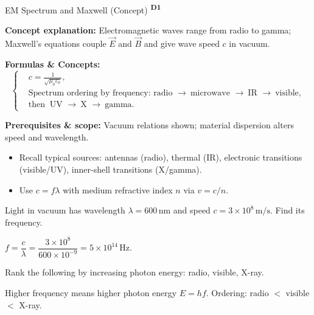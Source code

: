 ﻿\documentclass[12pt,a4paper]{article}
\providecommand{\KPFormulas}{}
\providecommand{\KPHeuristics}{}
\providecommand{\KPProblems}{}
\newcommand{\DOne}{\texorpdfstring{\textsuperscript{\textbf{D1}}}{ D1}}
\begin{document}
\begin{KnowledgePoint}{EM Spectrum and Maxwell (Concept) \DOne}
  \KPFormulas
  \begin{formulabox}
  \textbf{Concept explanation:} Electromagnetic waves range from radio to gamma; Maxwell's equations couple $\vec E$ and $\vec B$ and give wave speed $c$ in vacuum.

  \textbf{Formulas \& Concepts:}
  \[
  \left\{\begin{aligned}
    &c=\frac{1}{\sqrt{\mu_0\varepsilon_0}},\\
      &\text{Spectrum ordering by frequency: radio }\to\ \text{microwave }\to\ \text{IR }\to\ \text{visible},\\
      &\text{then }\ \text{UV }\to\ \text{X }\to\ \text{gamma}.
  \end{aligned}\right.
  \]

  \textbf{Prerequisites \& scope:} Vacuum relations shown; material dispersion alters speed and wavelength.
  \end{formulabox}

  \KPHeuristics
  \begin{heuristicsbox}
  \begin{itemize}[leftmargin=*]
    \item   Recall typical sources: antennas (radio), thermal (IR), electronic transitions (visible/UV), inner-shell transitions (X/gamma).
    \item Use $c=f\lambda$ with medium refractive index $n$ via $v=c/n$.
  \end{itemize}
  \end{heuristicsbox}

  \KPProblems
\begin{cheatproblem}
  Light in vacuum has wavelength $\lambda=600\,\text{nm}$ and speed $c=3\times10^8\,\text{m/s}$. Find its frequency.
\begin{solutionbox}
  $f=\dfrac{c}{\lambda}=\dfrac{3\times10^8}{600\times10^{-9}}=5\times10^{14}\,\text{Hz}$.
\end{solutionbox}
\end{cheatproblem}
\begin{cheatproblem}
  Rank the following by increasing photon energy: radio, visible, X-ray.
\begin{solutionbox}
  Higher frequency means higher photon energy $E=hf$. Ordering: radio $<$ visible $<$ X-ray.
\end{solutionbox}
\end{cheatproblem}
\end{KnowledgePoint}
\end{document}
